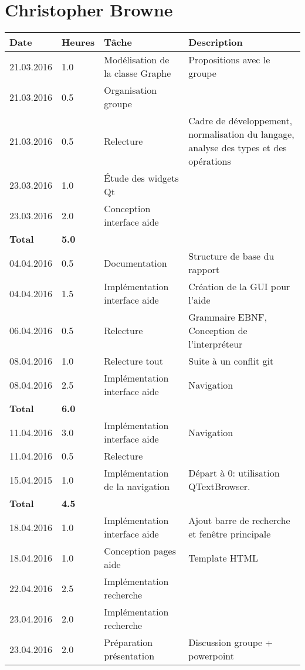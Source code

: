 \documentclass[french]{article}
\begin{document}
	\section*{Christopher Browne}
	\begin{longtable}{p{}|p{}|p{}|p{}}
		Date&Heures&Tâche&Description\\
		\hline \hline
		21.03.2016 & 1.0 & Modélisation de la classe Graphe & Propositions avec le groupe \\
		21.03.2016 & 0.5 & Organisation groupe & \\
		21.03.2016 & 0.5 & Relecture & Cadre de développement, normalisation du langage, analyse des types et des opérations \\
		23.03.2016 & 1.0 & Étude des widgets Qt & \\
		23.03.2016 & 2.0 & Conception interface aide & \\
		\textbf{Total} & \textbf{5.0} &&\\
		\hline
		04.04.2016 & 0.5 & Documentation & Structure de base du rapport \\
		04.04.2016 & 1.5 & Implémentation interface aide & Création de la GUI pour l'aide \\
		06.04.2016 & 0.5 & Relecture & Grammaire EBNF, Conception de l'interpréteur\\
		08.04.2016 & 1.0 & Relecture tout & Suite à un conflit git\\
		08.04.2016 & 2.5 & Implémentation interface aide & Navigation \\
		\textbf{Total} & \textbf{6.0} &&\\
		\hline
		11.04.2016 & 3.0 & Implémentation interface aide & Navigation \\
		11.04.2016 & 0.5 & Relecture & \\
		15.04.2015 & 1.0 & Implémentation de la navigation & Départ à 0: utilisation QTextBrowser.\\
		\textbf{Total} & \textbf{4.5} &&\\
		\hline
		18.04.2016 & 1.0 & Implémentation interface aide & Ajout barre de recherche et fenêtre principale \\
		18.04.2016 & 1.0 & Conception pages aide & Template HTML\\
		22.04.2016 & 2.5 & Implémentation recherche & \\
		23.04.2016 & 2.0 & Implémentation recherche & \\
		23.04.2016 & 2.0 & Préparation présentation & Discussion groupe + powerpoint\\

\end{longtable}
\end{document}

